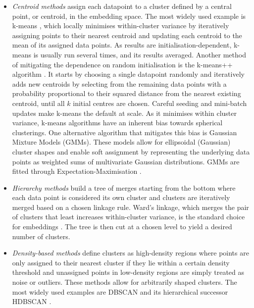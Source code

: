 \documentclass[11pt,a4paper,oneside]{report}
\begin{document}
\begin{itemize}
\item \emph{Centroid methods} assign each datapoint to a cluster defined by a central point, or centroid, in the embedding space. The most widely used example is k-means \citep{macqueen1967some,lloyd1982least}, which locally minimises within-cluster variance by iteratively assigning points to their nearest centroid and updating each centroid to the mean of its assigned data points. As results are initialisation-dependent, k-means is usually run several times, and its results averaged. Another method of mitigating the dependence on random initialisation is the k-means++ algorithm \citep{arthur2007kmeanspp}. It starts by choosing a single datapoint randomly and iteratively adds new centroids by selecting from the remaining data points with a probability proportional to their squared distance from the nearest existing centroid, until all $k$ initial centres are chosen. Careful seeding \citep{arthur2007kmeanspp} and mini-batch updates \citep{sculley2010webscale} make k-means the default at scale. As it minimises within cluster variance, k-means algorithms have an inherent bias towards spherical clusterings. One alternative algorithm that mitigates this bias is Gaussian Mixture Models (GMMs). These models allow for ellipsoidal (Gaussian) cluster shapes and enable soft assignment by representing the underlying data points as weighted sums of multivariate Gaussian distributions. GMMs are fitted through Expectation-Maximisation \citep{dempster1977em}.
\item \emph{Hierarchy methods} build a tree of merges starting from the bottom where each data point is considered its own cluster and clusters are iteratively merged based on a chosen linkage rule. Ward's linkage, which merges the pair of clusters that least increases within-cluster variance, is the standard choice for embeddings \citep{ward1963hierarchical}. The tree is then cut at a chosen level to yield a desired number of clusters.
\item \emph{Density-based methods} define clusters as high-density regions where points are only assigned to their nearest cluster if they lie within a certain density threshold and unassigned points in low-density regions are simply treated as noise or outliers. These methods allow for arbitrarily shaped clusters. The most widely used examples are DBSCAN \citep{ester1996dbscan} and its hierarchical successor HDBSCAN \citep{campello2013hdbscan}.

\end{itemize}
\end{document}
